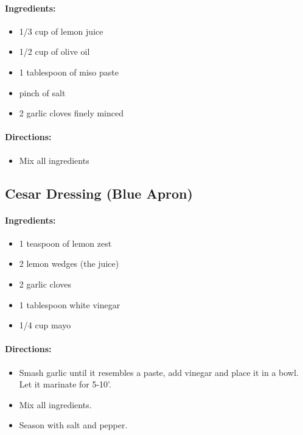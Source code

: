 \documentclass{article}
\begin{document}
\paragraph{Ingredients:}
\begin{itemize}
    \item 1/3 cup of lemon juice
    \item 1/2 cup of olive oil
    \item 1 tablespoon of miso paste
    \item pinch of salt
    \item 2 garlic cloves finely minced
\end{itemize}

\paragraph{Directions:}
\begin{itemize}
    \item Mix all ingredients
\end{itemize}

\subsection{Cesar Dressing (Blue Apron)}

\paragraph{Ingredients:}
\begin{itemize}
    \item 1 teaspoon of lemon zest
    \item 2 lemon wedges (the juice)
    \item 2 garlic cloves
    \item 1 tablespoon white vinegar
    \item 1/4 cup mayo
\end{itemize}

\paragraph{Directions:}
\begin{itemize}
    \item Smash garlic until it resembles a paste, add vinegar and place it in a bowl. Let it marinate for 5-10'.
    \item Mix all ingredients.
    \item Season with salt and pepper.
\end{itemize}
\end{document}
